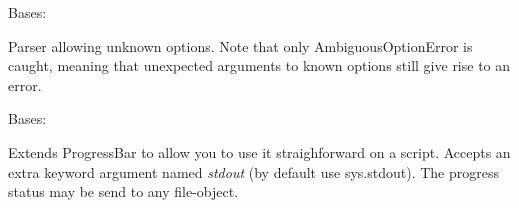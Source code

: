 \documentclass[letterpaper,10pt,english]{sphinxmanual}
\begin{document}
\begin{fulllineitems}
\label{index:encore.utils.AllowUnrecognizedOptionParser}
Bases: 

Parser allowing unknown options. Note that only AmbiguousOptionError
is caught, meaning that unexpected arguments to known options still give
rise to an error.

\end{fulllineitems}


\begin{fulllineitems}
\label{index:encore.utils.AnimatedProgressBar}
Bases: {\hyperref[index:encore.utils.ProgressBar]{}}

Extends ProgressBar to allow you to use it straighforward on a script.
Accepts an extra keyword argument named \emph{stdout} (by default use sys.stdout).
The progress status may be send to any file-object.

\begin{fulllineitems}
\label{index:encore.utils.AnimatedProgressBar.show_progress}
\end{fulllineitems}


\end{fulllineitems}

\end{document}
